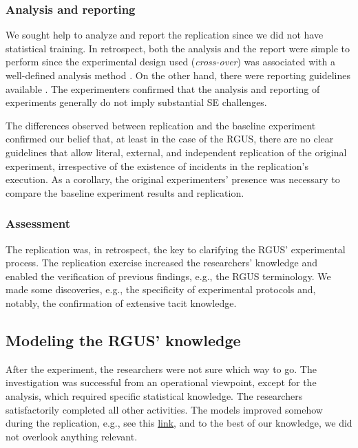\subsubsection{Analysis and reporting}
We sought help to analyze and report the replication since we did not have statistical training. In retrospect, both the analysis and the report were simple to perform since the experimental design used (\textit{cross-over}) was associated with a well-defined analysis method \cite{Vegas-2016-crossover-designs-experiments-SE}. On the other hand, there were reporting guidelines available \cite{Carver-2010-guidelines-replication-SE}. The experimenters confirmed that the analysis and reporting of experiments generally do not imply substantial SE challenges.

The differences observed between replication and the baseline experiment confirmed our belief that, at least in the case of the RGUS, there are no clear guidelines that allow literal, external, and independent replication \cite{Gomez-2014-understanding-replication} of the original experiment, irrespective of the existence of incidents in the replication's execution. As a corollary, the original experimenters' presence was necessary to compare the baseline experiment results and replication.

\subsubsection{Assessment}
The replication was, in retrospect, the key to clarifying the RGUS' experimental process. The replication exercise increased the researchers' knowledge and enabled the verification of previous findings, e.g., the RGUS terminology. We made some discoveries, e.g., the specificity of experimental protocols and, notably, the confirmation of extensive tacit knowledge.

\subsection{Modeling the RGUS' knowledge}\label{subsec-conocimiento-grupo}
After the experiment, the researchers were not sure which way to go. The investigation was successful from an operational viewpoint, except for the analysis, which required specific statistical knowledge. The researchers satisfactorily completed all other activities. The models improved somehow during the replication, e.g., see this \href{https://zenodo.org/record/7101676#.YytEquzMLUI}{\ul{link}}, and to the best of our knowledge, we did not overlook anything relevant.

